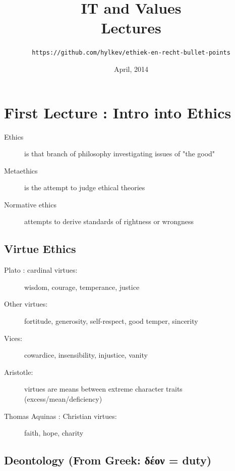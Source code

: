 \documentclass[a4paper]{article}
\begin{document}
\title{\textbf{IT and Values \\ Lectures}}
\author{\texttt{https://github.com/hylkev/ethiek-en-recht-bullet-points}}
\date{April, 2014}
\maketitle

\section{First Lecture : Intro into Ethics}

\begin{description}
\item[Ethics] is that branch of philosophy investigating issues of "the good"
\item[Metaethics] is the attempt to judge ethical theories
\item[Normative ethics] attempts to derive standards of rightness or wrongness
\end{description}

\subsection*{Virtue Ethics}

\begin{description}
\item[Plato : cardinal virtues:] wisdom, courage, temperance, justice
\item[Other virtues:] fortitude, generosity, self-respect, good temper, sincerity
\item[Vices:] cowardice, insensibility, injustice, vanity
\item[Aristotle:] virtues are means between extreme character traits (excess/mean/deficiency)
\item[Thomas Aquinas : Christian virtues:] faith, hope, charity
\end{description}

\subsection*{Deontology (From Greek: δέον = duty)}
\end{document}
